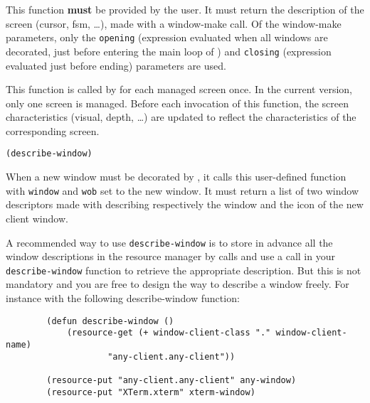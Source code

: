 This function {\bf must} be provided by the user. 
It must return the description of the screen (cursor, fsm, \ldots ), made with a
window-make call. Of the window-make parameters, only the \verb"opening"
(expression evaluated when all windows are decorated, just before entering
the main loop of {\GWM}) and \verb"closing" (expression evaluated just before
ending) parameters are used. 


This function is called by {\GWM} for each managed screen once. In the
current version, only one screen is managed. Before each invocation of this
function, the screen characteristics (visual, depth, \ldots) are updated to
reflect the characteristics of the corresponding screen.

        
{\usagefont\begin{verbatim}
(describe-window)
\end{verbatim}}\usageupspace

When a new window must be decorated by {\GWM}, it calls this user-defined
function with \verb"window" and \verb"wob" set to the new window. It must
return a list of two window descriptors made with 
describing respectively the window and the icon of the new client window.

A recommended way to use \verb"describe-window"  is to store in advance all
the window descriptions in the resource manager by  calls
and use a  call in your \verb"describe-window" function to
retrieve the appropriate description. But this is not mandatory and you are
free to design the way to describe a window freely.  For instance with the
following describe-window function:

{\exemplefont\begin{verbatim}
        (defun describe-window ()
            (resource-get (+ window-client-class "." window-client-name)
                    "any-client.any-client"))

        (resource-put "any-client.any-client" any-window)
        (resource-put "XTerm.xterm" xterm-window)
\end{verbatim}}

